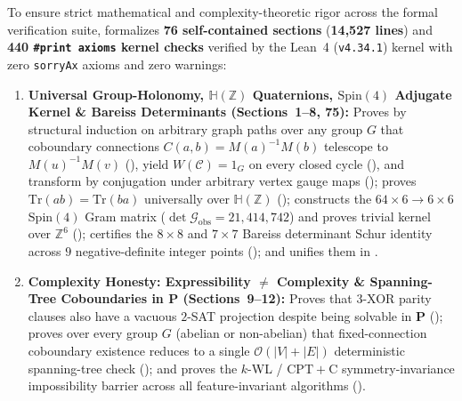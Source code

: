 \documentclass[11pt,a4paper]{article}
\theoremstyle{definition}
\begin{document}
{\sloppy
To ensure strict mathematical and complexity-theoretic rigor across the formal verification suite,  formalizes \textbf{76 self-contained sections} (\textbf{14,527 lines}) and \textbf{440 \texttt{\#print axioms} kernel checks} verified by the Lean~4 (\texttt{v4.34.1}) kernel with zero \texttt{sorryAx} axioms and zero warnings:
\begin{enumerate}
    \item \textbf{Universal Group-Holonomy, $\mathbb{H}(\mathbb{Z})$ Quaternions, $\mathrm{Spin}(4)$ Adjugate Kernel \& Bareiss Determinants (Sections~1--8, 75):} Proves by structural induction on arbitrary graph paths over any group $G$ that coboundary connections $C(a,b) = M(a)^{-1}M(b)$ telescope to $M(u)^{-1}M(v)$ (), yield $W(\mathcal{C}) = 1_G$ on every closed cycle (), and transform by conjugation under arbitrary vertex gauge maps (); proves $\mathrm{Tr}(ab) = \mathrm{Tr}(ba)$ universally over $\mathbb{H}(\mathbb{Z})$ (); constructs the $64\times 6 \to 6\times 6$ $\mathrm{Spin}(4)$ Gram matrix ($\det \mathcal{G}_{\mathrm{obs}} = 21{,}414{,}742$) and proves trivial kernel over $\mathbb{Z}^6$ (); certifies the $8\times 8$ and $7\times 7$ Bareiss determinant Schur identity across $9$ negative-definite integer points (); and unifies them in .
    \item \textbf{Complexity Honesty: Expressibility $\neq$ Complexity \& Spanning-Tree Coboundaries in $\mathbf{P}$ (Sections~9--12):} Proves that $3$-XOR parity clauses also have a vacuous $2$-SAT projection despite being solvable in $\mathbf{P}$ (); proves over every group $G$ (abelian or non-abelian) that fixed-connection coboundary existence reduces to a single $\mathcal{O}(|V|+|E|)$ deterministic spanning-tree check (); and proves the $k$-WL / $\mathrm{CPT}+\mathrm{C}$ symmetry-invariance impossibility barrier across all feature-invariant algorithms ().

\end{enumerate}}
\end{document}
